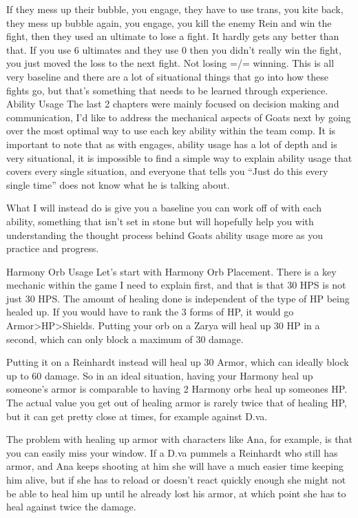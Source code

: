 If they mess up their bubble, you engage, they have to use trans, you kite back, they mess up bubble again, you engage, you kill the enemy Rein and win the fight, then they used an ultimate to lose a fight. It hardly gets any better than that. If you use 6 ultimates and they use 0 then you didn’t really win the fight, you just moved the loss to the next fight. Not losing =/= winning. This is all very baseline and there are a lot of situational things that go into how these fights go, but that’s something that needs to be learned through experience. 
Ability Usage
The last 2 chapters were mainly focused on decision making and communication, I’d like to address the mechanical aspects of Goats next by going over the most optimal way to use each key ability within the team comp. It is important to note that as with engages, ability usage has a lot of depth and is very situational, it is impossible to find a simple way to explain ability usage that covers every single situation, and everyone that tells you “Just do this every single time” does not know what he is talking about.

What I will instead do is give you a baseline you can work off of with each ability, something that isn’t set in stone but will hopefully help you with understanding the thought process behind Goats ability usage more as you practice and progress.

Harmony Orb Usage
Let’s start with Harmony Orb Placement. There is a key mechanic within the game I need to explain first, and that is that 30 HPS is not just 30 HPS. The amount of healing done is independent of the type of HP being healed up. If you would have to rank the 3 forms of HP, it would go Armor>HP>Shields. Putting your orb on a Zarya will heal up 30 HP in a second, which can only block a maximum of 30 damage.

Putting it on a Reinhardt instead will heal up 30 Armor, which can ideally block up to 60 damage. So in an ideal situation, having your Harmony heal up someone's armor is comparable to having 2 Harmony orbs heal up someones HP. The actual value you get out of healing armor is rarely twice that of healing HP, but it can get pretty close at times, for example against D.va.


The problem with healing up armor with characters like Ana, for example, is that you can easily miss your window. If a D.va pummels a Reinhardt who still has armor, and Ana keeps shooting at him she will have a much easier time keeping him alive, but if she has to reload or doesn’t react quickly enough she might not be able to heal him up until he already lost his armor, at which point she has to heal against twice the damage.  

